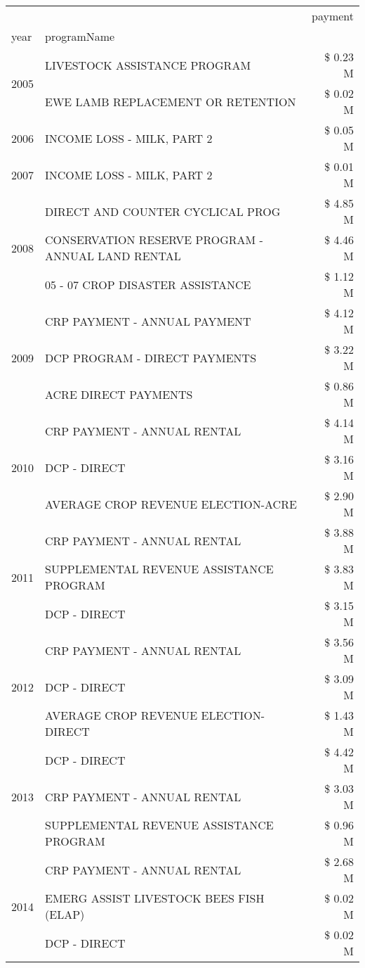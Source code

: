 \begin{tabular}{llr}
\toprule
 &  & payment \\
year & programName &  \\
\midrule
\multirow[t]{2}{*}{2005} & LIVESTOCK ASSISTANCE PROGRAM & \$ 0.23 M \\
 & EWE LAMB REPLACEMENT OR RETENTION & \$ 0.02 M \\
\cline{1-3}
2006 & INCOME LOSS - MILK, PART 2 & \$ 0.05 M \\
\cline{1-3}
2007 & INCOME LOSS - MILK, PART 2 & \$ 0.01 M \\
\cline{1-3}
\multirow[t]{3}{*}{2008} & DIRECT AND COUNTER CYCLICAL PROG & \$ 4.85 M \\
 & CONSERVATION RESERVE PROGRAM - ANNUAL LAND RENTAL & \$ 4.46 M \\
 & 05 - 07 CROP DISASTER ASSISTANCE & \$ 1.12 M \\
\cline{1-3}
\multirow[t]{3}{*}{2009} & CRP PAYMENT - ANNUAL PAYMENT & \$ 4.12 M \\
 & DCP PROGRAM - DIRECT PAYMENTS & \$ 3.22 M \\
 & ACRE DIRECT PAYMENTS & \$ 0.86 M \\
\cline{1-3}
\multirow[t]{3}{*}{2010} & CRP PAYMENT - ANNUAL RENTAL & \$ 4.14 M \\
 & DCP - DIRECT & \$ 3.16 M \\
 & AVERAGE CROP REVENUE ELECTION-ACRE & \$ 2.90 M \\
\cline{1-3}
\multirow[t]{3}{*}{2011} & CRP PAYMENT - ANNUAL RENTAL & \$ 3.88 M \\
 & SUPPLEMENTAL REVENUE ASSISTANCE PROGRAM & \$ 3.83 M \\
 & DCP - DIRECT & \$ 3.15 M \\
\cline{1-3}
\multirow[t]{3}{*}{2012} & CRP PAYMENT - ANNUAL RENTAL & \$ 3.56 M \\
 & DCP - DIRECT & \$ 3.09 M \\
 & AVERAGE CROP REVENUE ELECTION-DIRECT & \$ 1.43 M \\
\cline{1-3}
\multirow[t]{3}{*}{2013} & DCP - DIRECT & \$ 4.42 M \\
 & CRP PAYMENT - ANNUAL RENTAL & \$ 3.03 M \\
 & SUPPLEMENTAL REVENUE ASSISTANCE PROGRAM & \$ 0.96 M \\
\cline{1-3}
\multirow[t]{3}{*}{2014} & CRP PAYMENT - ANNUAL RENTAL & \$ 2.68 M \\
 & EMERG ASSIST LIVESTOCK BEES FISH (ELAP) & \$ 0.02 M \\
 & DCP - DIRECT & \$ 0.02 M \\

\end{tabular}
